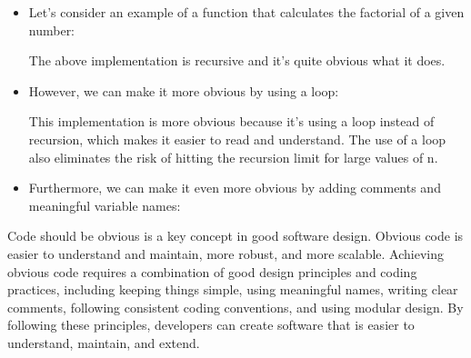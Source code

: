{ 
	
	\begin{itemize}
		\item Let's consider an example of a function that calculates the factorial of a given number:\newline





		The above implementation is recursive and it's quite obvious what it does. \newpage
		
		\item However, we can make it more obvious by using a loop:\newline
		
	
		
		This implementation is more obvious because it's using a loop instead of recursion, which makes it easier to read and understand. The use of a loop also eliminates the risk of hitting the recursion limit for large values of n.\newline
		\newpage
		\item Furthermore, we can make it even more obvious by adding comments and meaningful variable names:\newline
	
	    	
	
		
	\end{itemize}
}
{
Code should be obvious is a key concept in good software design. Obvious code is easier to understand and maintain, more robust, and more scalable. Achieving obvious code requires a combination of good design principles and coding practices, including keeping things simple, using meaningful names, writing clear comments, following consistent coding conventions, and using modular design. By following these principles, developers can create software that is easier to understand, maintain, and extend.
}
